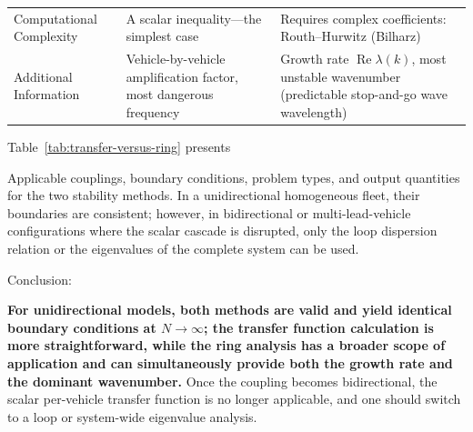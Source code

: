 \documentclass[11pt,a4paper,openany]{book}
\numberwithin{equation}{chapter}
\numberwithin{figure}{chapter}
\numberwithin{table}{chapter}
\newcommand{\tabletext}[2]{%
  \par\smallskip\noindent
  Table~\ref{#1} presents #2
\par\smallskip
}
\begin{document}
\begin{center}
\begin{tabular}{p{3.0cm}p{5.4cm}p{5.4cm}}
\\[4pt]

Computational Complexity




&




A scalar inequality—the simplest case




&




Requires complex coefficients: Routh–Hurwitz (Bilharz)



\\[4pt]

Additional Information




&




 Vehicle-by-vehicle amplification factor, most dangerous frequency




&




 Growth rate $\operatorname{Re}\lambda(k)$, most unstable wavenumber (predictable stop-and-go wave wavelength)



\\
\bottomrule
\end{tabular}
\end{center}
\tabletext{tab:transfer-versus-ring}{




Applicable couplings, boundary conditions, problem types, and output quantities for the two stability methods. In a unidirectional homogeneous fleet, their boundaries are consistent; however, in bidirectional or multi-lead-vehicle configurations where the scalar cascade is disrupted, only the loop dispersion relation or the eigenvalues of the complete system can be used.
}










Conclusion:




\textbf{For unidirectional models, both methods are valid and yield identical boundary conditions at $N\to\infty$; the transfer function calculation is more straightforward, while the ring analysis has a broader scope of application and can simultaneously provide both the growth rate and the dominant wavenumber.} Once the coupling becomes bidirectional, the scalar per-vehicle transfer function is no longer applicable, and one should switch to a loop or system-wide eigenvalue analysis.
\end{document}
